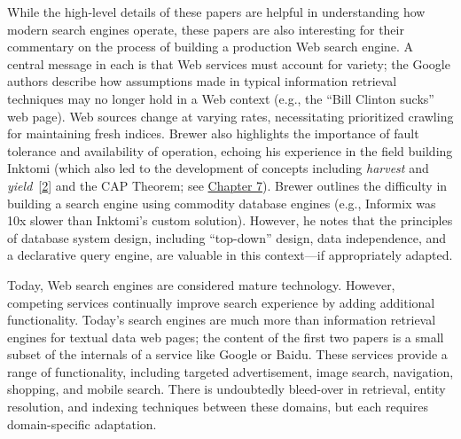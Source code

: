 \documentclass[b5paper,11pt,twoside,openright]{book}
\begin{document}
While the high-level details of these papers are helpful in
understanding how modern search engines operate, these papers are also
interesting for their commentary on the process of building a production
Web search engine. A central message in each is that Web services must
account for variety; the Google authors describe how assumptions made in
typical information retrieval techniques may no longer hold in a Web
context (e.g., the ``Bill Clinton sucks'' web page). Web sources change
at varying rates, necessitating prioritized crawling for maintaining
fresh indices. Brewer also highlights the importance of fault tolerance
and availability of operation, echoing his experience in the field
building Inktomi (which also led to the development of concepts
including \emph{harvest} and
\emph{yield}~{{[}\protect\hyperlink{ref-harvest-yield}{2}{]}} and the
CAP Theorem; see \hyperref[ch7-queryoptimization]{Chapter 7}). Brewer
outlines the difficulty in building a search engine using commodity
database engines (e.g., Informix was 10x slower than Inktomi's custom
solution). However, he notes that the principles of database system
design, including ``top-down'' design, data independence, and a
declarative query engine, are valuable in this context---if
appropriately adapted.

Today, Web search engines are considered mature technology. However,
competing services continually improve search experience by adding
additional functionality. Today's search engines are much more than
information retrieval engines for textual data web pages; the content of
the first two papers is a small subset of the internals of a service
like Google or Baidu. These services provide a range of functionality,
including targeted advertisement, image search, navigation, shopping,
and mobile search. There is undoubtedly bleed-over in retrieval, entity
resolution, and indexing techniques between these domains, but each
requires domain-specific adaptation.
\end{document}
